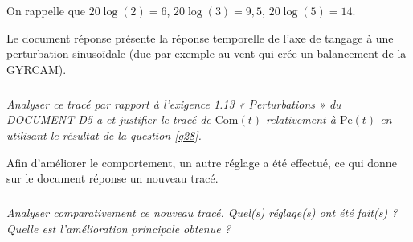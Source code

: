 \documentclass[10pt,fleqn]{article} %
\begin{document}
On rappelle que $20\log(2)=6$, $20\log(3)=9,5$, $20\log(5)=14$.

Le document réponse présente la réponse temporelle de l’axe de tangage à une perturbation sinusoïdale (due par exemple au vent qui crée un balancement de la GYRCAM).


\subparagraph{\label{q32}}\textit{Analyser ce tracé par rapport à l’exigence 1.13 « Perturbations » du DOCUMENT D5-a et justifier le tracé de $\text{Com}(t)$ relativement à $\text{Pe}(t)$ en utilisant le résultat de la question \ref{q28}.}

Afin d’améliorer le comportement, un autre réglage a été effectué, ce qui donne sur le document réponse un nouveau tracé. 

\subparagraph{\label{q33}}\textit{Analyser comparativement ce nouveau tracé. Quel(s) réglage(s) ont été fait(s) ? Quelle est l’amélioration principale obtenue ?}










\end{document}
